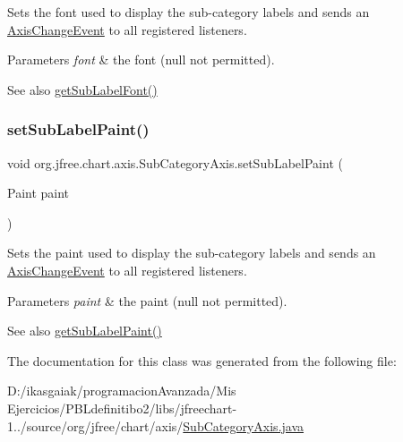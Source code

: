 Sets the font used to display the sub-\/category labels and sends an \mbox{\hyperlink{}{Axis\+Change\+Event}} to all registered listeners.


\begin{DoxyParams}{Parameters}
{\em font} & the font ({\ttfamily null} not permitted).\\
\hline
\end{DoxyParams}
\begin{DoxySeeAlso}{See also}
\mbox{\hyperlink{classorg_1_1jfree_1_1chart_1_1axis_1_1_sub_category_axis_a8ba516ab1bc79bf6b3f2a0e98e25f759}{get\+Sub\+Label\+Font()}} 
\end{DoxySeeAlso}
\mbox{\label{classorg_1_1jfree_1_1chart_1_1axis_1_1_sub_category_axis_a92b94ccece53829f092607e7331cd7ef}} 
\subsubsection{\texorpdfstring{set\+Sub\+Label\+Paint()}{setSubLabelPaint()}}
{\footnotesize\ttfamily void org.\+jfree.\+chart.\+axis.\+Sub\+Category\+Axis.\+set\+Sub\+Label\+Paint (\begin{DoxyParamCaption}\item[{Paint}]{paint }\end{DoxyParamCaption})}

Sets the paint used to display the sub-\/category labels and sends an \mbox{\hyperlink{}{Axis\+Change\+Event}} to all registered listeners.


\begin{DoxyParams}{Parameters}
{\em paint} & the paint ({\ttfamily null} not permitted).\\
\hline
\end{DoxyParams}
\begin{DoxySeeAlso}{See also}
\mbox{\hyperlink{classorg_1_1jfree_1_1chart_1_1axis_1_1_sub_category_axis_aef43f68433c27fb74ddc51d40681f91e}{get\+Sub\+Label\+Paint()}} 
\end{DoxySeeAlso}


The documentation for this class was generated from the following file\+:\begin{DoxyCompactItemize}
\item 
D\+:/ikasgaiak/programacion\+Avanzada/\+Mis Ejercicios/\+P\+B\+Ldefinitibo2/libs/jfreechart-\/1../source/org/jfree/chart/axis/\mbox{\hyperlink{_sub_category_axis_8java}{Sub\+Category\+Axis.\+java}}\end{DoxyCompactItemize}
